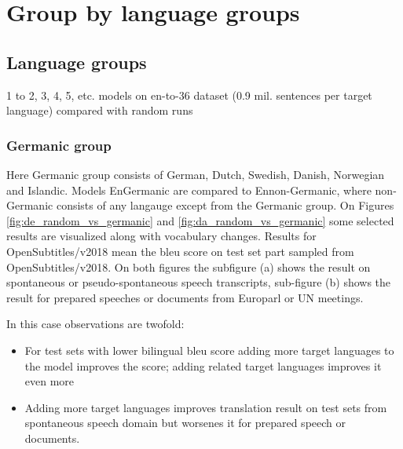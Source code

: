 \chapter{Group by language groups}

\section{Language groups}
1 to 2, 3, 4, 5, etc. models on en-to-36 dataset (0.9 mil. sentences per target language)
compared with random runs
\subsection{Germanic group}
\label{subsection:germanic_group}

Here Germanic group consists of German, Dutch, Swedish, Danish, Norwegian and Islandic.
Models En\to{}Germanic are compared to En\to{}non-Germanic, where non-Germanic consists
of any langauge except from the Germanic group.
On Figures \ref{fig:de_random_vs_germanic} and \ref{fig:da_random_vs_germanic} some selected
results are visualized along with vocabulary changes. Results for OpenSubtitles/v2018 mean
the \acrshort{bleu} score on test set part sampled from OpenSubtitles/v2018.
On both figures the subfigure (a) shows the result on spontaneous or pseudo-spontaneous speech
transcripts, sub-figure (b) shows the result for prepared speeches or documents from Europarl
or UN meetings.

In this case observations are twofold:
\begin{itemize}
	\item For test sets with lower bilingual \acrshort{bleu} score adding more target languages
		to the model improves the score;
		adding related target languages improves it even more
	\item Adding more target languages improves translation result on test
		sets from spontaneous speech domain
		but worsenes it for prepared speech or documents.
\end{itemize}

